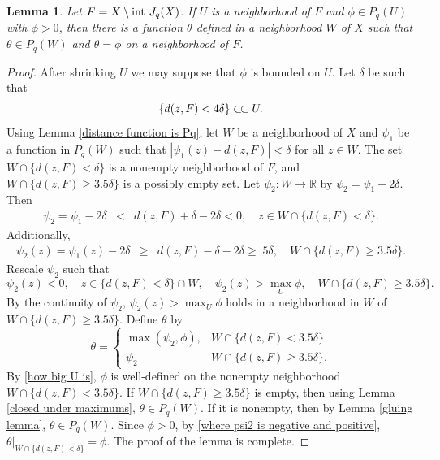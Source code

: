 \documentclass[12pt]{amsart}
\newtheorem{lem}[theorem]{Lemma}
\numberwithin{equation}{section}
{\theoremstyle{definition}
\newtheorem{remark}[theorem]{Remark}
}
\newcommand{\ssubset}{\subset\joinrel\subset}
\begin{document}
\begin{lem}\label{break up of the longer lemma into a second part}
    Let $F = X \setminus \hbox{int }J_q(X)$.  If $U$ is a neighborhood of $F$ and $\phi \in P_q(U)$ with $\phi > 0$, then there is a function $\theta$ defined in a neighborhood $W$ of $X$ such that $\theta \in P_q(W)$ and $\theta = \phi$ on a neighborhood of $F$.
\end{lem}
\begin{proof}
After shrinking $U$ we may suppose that $\phi$ is bounded on $U$.  Let $\delta$ be such that 
\begin{equation}\label{how big U is}
\{d(z, F) < 4\delta\} \ssubset U.
\end{equation}
Using Lemma \ref{distance function is Pq}, let $W$ be a neighborhood of $X$ and $\psi_1$ be a function in $P_q(W)$ such that
$|\psi_1(z) - d(z, F)| < \delta$ for all $z \in W$. The set $W \cap \{d(z, F) < \delta\}$ is a nonempty neighborhood of $F$, and $W \cap \{d(z, F) \geq 3.5\delta\}$ is a possibly empty set.
Let $\psi_2:W \to \mathbb{R}$ by $\psi_2 = \psi_1 - 2\delta$.  Then
\begin{eqnarray*}
    \psi_2 = \psi_1 - 2\delta &<& d(z, F) + \delta - 2\delta < 0, \quad z \in W \cap \{d(z, F) < \delta\}.
\end{eqnarray*}
Additionally,
\begin{eqnarray*}
\psi_2(z) = \psi_1(z) - 2\delta &\geq& d(z, F) - \delta - 2\delta \geq .5\delta, \quad W \cap \{d(z, F) \geq 3.5\delta\}.
\end{eqnarray*}
Rescale $\psi_2$ such that
\begin{equation}\label{where psi2 is negative and positive}
\psi_2(z) < 0, \quad z \in \{d(z, F) < \delta\} \cap W, \quad \psi_2(z) > \max_{U}\phi, \quad W \cap \{d(z, F) \geq 3.5\delta\}.
\end{equation}
By the continuity of $\psi_2$, $\psi_2(z) > \max_U \phi$ holds in a neighborhood in $W$ of $W \cap \{d(z, F) \geq 3.5\delta\}$. Define $\theta$ by
\begin{equation}
\theta = \begin{cases} 
\max(\psi_2, \phi), & W\cap \{d(z, F) < 3.5\delta\}
\\
\psi_2 & W \cap \{d(z, F) \geq 3.5\delta\}.
\end{cases}
\end{equation}
By \eqref{how big U is}, $\phi$ is well-defined on the nonempty neighborhood $W\cap \{d(z, F) < 3.5\delta\}$.  If $W \cap \{d(z, F) \geq 3.5\delta\}$ is empty, then using Lemma \ref{closed under maximums}, $\theta \in P_q(W)$.  If it is nonempty, then by Lemma \ref{gluing lemma}, $\theta \in P_q(W)$.  
Since $\phi > 0$, by \eqref{where psi2 is negative and positive},
$
\theta|_{W \cap \{d(z, F) < \delta\}} = \phi.
$
 The proof of the lemma is complete.


    
\end{proof}
\end{document}
